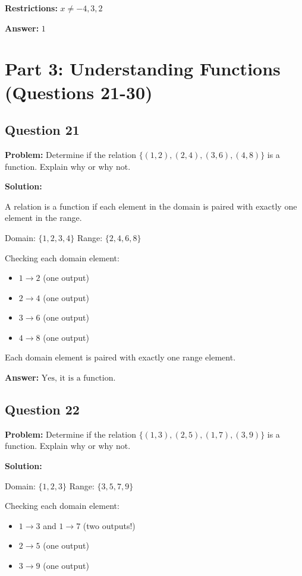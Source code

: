\documentclass[12pt]{article}
\begin{document}
\textbf{Restrictions:} $x \neq -4, 3, 2$

\textbf{Answer:} $\boxed{1}$

\newpage

\section*{Part 3: Understanding Functions (Questions 21-30)}

\subsection*{Question 21}
\textbf{Problem:} Determine if the relation $\{(1, 2), (2, 4), (3, 6), (4, 8)\}$ is a function. Explain why or why not.

\textbf{Solution:}

A relation is a function if each element in the domain is paired with exactly one element in the range.

Domain: $\{1, 2, 3, 4\}$
Range: $\{2, 4, 6, 8\}$

Checking each domain element:
\begin{itemize}
\item $1 \to 2$ (one output)
\item $2 \to 4$ (one output)
\item $3 \to 6$ (one output)
\item $4 \to 8$ (one output)
\end{itemize}

Each domain element is paired with exactly one range element.

\textbf{Answer:} $\boxed{\text{Yes, it is a function.}}$

\subsection*{Question 22}
\textbf{Problem:} Determine if the relation $\{(1, 3), (2, 5), (1, 7), (3, 9)\}$ is a function. Explain why or why not.

\textbf{Solution:}

Domain: $\{1, 2, 3\}$
Range: $\{3, 5, 7, 9\}$

Checking each domain element:
\begin{itemize}
\item $1 \to 3$ and $1 \to 7$ (two outputs!)
\item $2 \to 5$ (one output)
\item $3 \to 9$ (one output)
\end{itemize}
\end{document}
